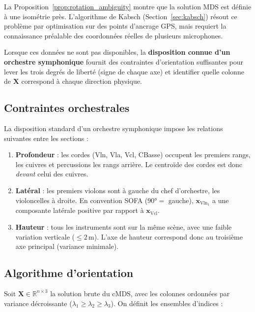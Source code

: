 \documentclass[12pt, a4paper]{article}
\theoremstyle{plain}
\theoremstyle{definition}
\newcommand{\R}{\mathbb{R}}
\newcommand{\mat}[1]{\mathbf{#1}}
\newcommand{\vect}[1]{\mathbf{#1}}
\begin{document}
La Proposition~\ref{prop:rotation_ambiguity} montre que la solution MDS est
définie à une isométrie près.  L'algorithme de Kabsch (Section~\ref{sec:kabsch})
résout ce problème par optimisation sur des points d'ancrage GPS, mais
requiert la connaissance préalable des coordonnées réelles de plusieurs
microphones.

Lorsque ces données ne sont pas disponibles, la \textbf{disposition connue
d'un orchestre symphonique} fournit des contraintes d'orientation suffisantes
pour lever les trois degrés de liberté (signe de chaque axe) et identifier
quelle colonne de $\mat{X}$ correspond à chaque direction physique.

\subsection{Contraintes orchestrales}

La disposition standard d'un orchestre symphonique impose les relations
suivantes entre les sections :

\begin{enumerate}
    \item \textbf{Profondeur} : les cordes (Vln, Vla, Vcl, CBasse) occupent
        les premiers rangs, les cuivres et percussions les rangs arrière.
        Le centroïde des cordes est donc \emph{devant} celui des cuivres.

    \item \textbf{Latéral} : les premiers violons sont à gauche du chef
        d'orchestre, les violoncelles à droite.  En convention SOFA
        ($90° =$ gauche), $\vect{x}_{\text{Vln}_1}$ a une composante latérale
        positive par rapport à $\vect{x}_{\text{Vcl}}$.

    \item \textbf{Hauteur} : tous les instruments sont sur la même scène,
        avec une faible variation verticale ($\leq 2\,\text{m}$).  L'axe de
        hauteur correspond donc au troisième axe principal (variance minimale).
\end{enumerate}

\subsection{Algorithme d'orientation}

Soit $\mat{X} \in \R^{n \times 3}$ la solution brute du cMDS, avec les
colonnes ordonnées par variance décroissante ($\lambda_1 \geq \lambda_2 \geq
\lambda_3$).  On définit les ensembles d'indices :
\end{document}
